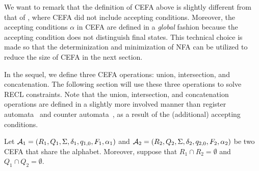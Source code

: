 We want to remark that the definition of CEFA above is slightly different from that of \cite{atva2020}, where CEFA did not include accepting conditions.
Moreover, the accepting conditions $\alpha$ in CEFA are defined in a \emph{global} fashion because the accepting condition does not distinguish final states. This technical choice is made so that the determinization and minimization of NFA can be utilized to reduce the size of CEFA in the next section. 

In the sequel, we define three CEFA operations: union, intersection, and concatenation. The following section will use these three operations to solve RECL constraints. Note that the union, intersection, and concatenation operations are defined in a slightly more involved manner than register automata~\cite{ra} and counter automata~\cite{GGM12}, as a result of the (additional) accepting conditions. 

Let $\mathcal{A}_1 = (R_1, Q_1, \Sigma, \delta_1, q_{1,0}, F_1, \alpha_1)$ and  $\mathcal{A}_2 = (R_2, Q_2, \Sigma, \delta_2, q_{2,0}, F_2, \alpha_2)$ be two CEFA that share the alphabet. 
Moreover, suppose that $R_1 \cap R_2 = \emptyset$ and $Q_1 \cap Q_2 = \emptyset$. 

